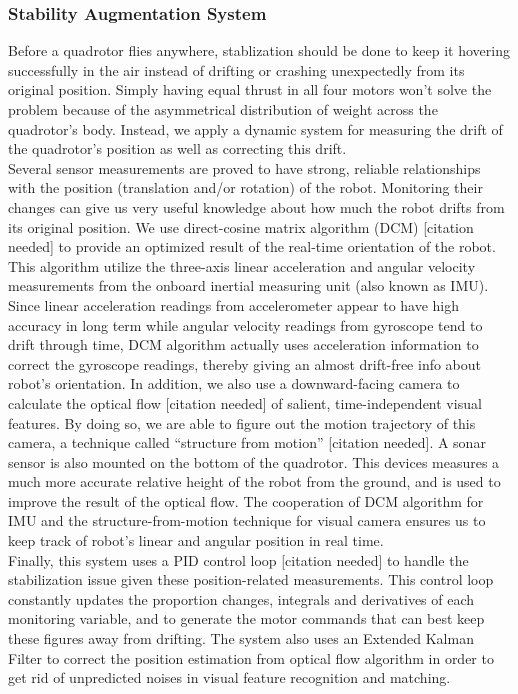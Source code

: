 \documentclass[12pt, letterpaper]{article}
\begin{document}
\subsubsection{Stability Augmentation System}

Before a quadrotor flies anywhere, stablization should be done to keep it hovering successfully in the air instead of drifting or crashing unexpectedly from its original position. Simply having equal thrust in all four motors won't solve the problem because of the asymmetrical distribution of weight across the quadrotor's body. Instead, we apply a dynamic system for measuring the drift of the quadrotor's position as well as correcting this drift.
\\
Several sensor measurements are proved to have strong, reliable relationships with the position (translation and/or rotation) of the robot. Monitoring their changes can give us very useful knowledge about how much the robot drifts from its original position. We use direct-cosine matrix algorithm (DCM) [citation needed] to provide an optimized result of the real-time orientation of the robot. This algorithm utilize the three-axis linear acceleration and angular velocity measurements from the onboard inertial measuring unit (also known as IMU). Since linear acceleration readings from accelerometer appear to have high accuracy in long term while angular velocity readings from gyroscope tend to drift through time, DCM algorithm actually uses acceleration information to correct the gyroscope readings, thereby giving an almost drift-free info about robot's orientation. In addition, we also use a downward-facing camera to calculate the optical flow [citation needed] of salient, time-independent visual features. By doing so, we are able to figure out the motion trajectory of this camera, a technique called “structure from motion” [citation needed]. A sonar sensor is also mounted on the bottom of the quadrotor. This devices measures a much more accurate relative height of the robot from the ground, and is used to improve the result of the optical flow. The cooperation of DCM algorithm for IMU and the structure-from-motion technique for visual camera ensures us to keep track of robot's linear and angular position in real time.
\\
Finally, this system uses a PID control loop [citation needed] to handle the stabilization issue given these position-related measurements. This control loop constantly updates the proportion changes, integrals and derivatives of each monitoring variable, and to generate the motor commands that can best keep these figures away from drifting. The system also uses an Extended Kalman Filter to correct the position estimation from optical flow algorithm in order to get rid of unpredicted noises in visual feature recognition and matching.
\end{document}
